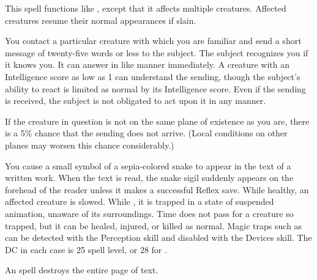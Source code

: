 \spelldur{\durlong \dismissable}
\spelleffect This spell functions like , except that it affects multiple creatures. Affected creatures resume their normal appearances if slain.

\spelleffect You contact a particular creature with which you are familiar and send a short message of twenty-five words or less to the subject. The subject recognizes you if it knows you. It can answer in like manner immediately. A creature with an Intelligence score as low as 1 can understand the sending, though the subject's ability to react is limited as normal by its Intelligence score. Even if the sending is received, the subject is not obligated to act upon it in any manner.
\par If the creature in question is not on the same plane of existence as you are, there is a 5\% chance that the sending does not arrive. (Local conditions on other planes may worsen this chance considerably.)

\spelleffect You cause a small symbol of a sepia-colored snake to appear in the text of a written work. When the text is read, the snake sigil suddenly appears on the forehead of the reader unless it makes a successful Reflex save. While healthy, an affected creature is slowed. While \bloodied, it is trapped in a state of suspended animation, unaware of its surroundings. Time does not pass for a creature so trapped, but it can be healed, injured, or killed as normal.
\spellnotes Magic traps such as  can be detected with the Perception skill and disabled with the Devices skill. The DC in each case is 25 \add spell level, or 28 for .

An  spell destroys the entire page of text.

